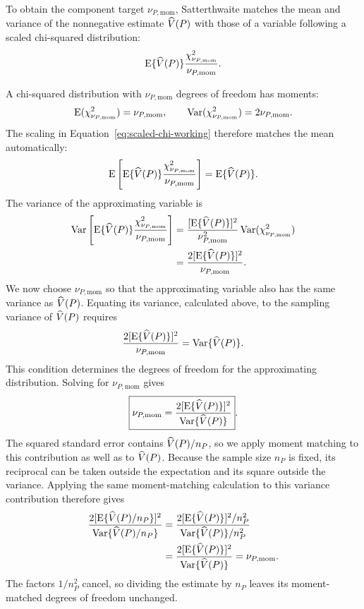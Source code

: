 \medskip
{}

To obtain the component target \(\nu_{P,\mathrm{mom}}\), Satterthwaite
matches the mean and variance of the nonnegative estimate \(\widehat V(P)\)
with those of a variable following a scaled chi-squared distribution:
\begin{equation}
  \operatorname{E}\{\widehat V(P)\}
  \frac{\chi^2_{\nu_{P,\mathrm{mom}}}}{\nu_{P,\mathrm{mom}}}.
  \label{eq:scaled-chi-working}
\end{equation}

A chi-squared distribution with \(\nu_{P,\mathrm{mom}}\) degrees of freedom
has moments:
\begin{equation}
  \operatorname{E}(\chi^2_{\nu_{P,\mathrm{mom}}})=\nu_{P,\mathrm{mom}},
  \qquad
  \operatorname{Var}(\chi^2_{\nu_{P,\mathrm{mom}}})=2\nu_{P,\mathrm{mom}}.
\end{equation}
The scaling in Equation~\eqref{eq:scaled-chi-working} therefore matches the
mean automatically:
\begin{equation}
  \operatorname{E}\left[
  \operatorname{E}\{\widehat V(P)\}\frac{\chi^2_{\nu_{P,\mathrm{mom}}}}{\nu_{P,\mathrm{mom}}}
  \right]
  =\operatorname{E}\{\widehat V(P)\}.
\end{equation}
The variance of the approximating variable is
\begin{align}
  \operatorname{Var}\left[
  \operatorname{E}\{\widehat V(P)\}\frac{\chi^2_{\nu_{P,\mathrm{mom}}}}{\nu_{P,\mathrm{mom}}}
  \right]
  &=
  \frac{[\operatorname{E}\{\widehat V(P)\}]^2}{\nu_{P,\mathrm{mom}}^2}
  \operatorname{Var}(\chi^2_{\nu_{P,\mathrm{mom}}})\\
  &=
  \frac{2[\operatorname{E}\{\widehat V(P)\}]^2}{\nu_{P,\mathrm{mom}}}.
\end{align}
We now choose \(\nu_{P,\mathrm{mom}}\) so that the approximating variable
also has the same variance as \(\widehat V(P)\). Equating its variance,
calculated above, to the sampling variance of \(\widehat V(P)\) requires
\begin{equation*}
  \frac{2[\operatorname{E}\{\widehat V(P)\}]^2}{\nu_{P,\mathrm{mom}}}
  =\operatorname{Var}\{\widehat V(P)\}.
\end{equation*}
This condition determines the degrees of freedom for the approximating
distribution. Solving for \(\nu_{P,\mathrm{mom}}\) gives
\begin{equation}
  \boxed{
  \nu_{P,\mathrm{mom}}
  =
  \frac{2[\operatorname{E}\{\widehat V(P)\}]^2}
       {\operatorname{Var}\{\widehat V(P)\}}
  }.
  \label{eq:component-df-moments}
\end{equation}
The squared standard error contains \(\widehat V(P)/n_P\), so we apply
moment matching to this contribution as well as to \(\widehat V(P)\).
Because the sample size \(n_P\) is fixed, its reciprocal can be taken
outside the expectation and its square outside the variance.
Applying the same moment-matching calculation to this variance contribution
therefore gives
\begin{align*}
  \frac{2[\operatorname{E}\{\widehat V(P)/n_P\}]^2}
       {\operatorname{Var}\{\widehat V(P)/n_P\}}
  &=\frac{2[\operatorname{E}\{\widehat V(P)\}]^2/n_P^2}
          {\operatorname{Var}\{\widehat V(P)\}/n_P^2}\\
  &=\frac{2[\operatorname{E}\{\widehat V(P)\}]^2}
          {\operatorname{Var}\{\widehat V(P)\}}
   =\nu_{P,\mathrm{mom}}.
\end{align*}
The factors \(1/n_P^2\) cancel, so dividing the estimate by \(n_P\)
leaves its moment-matched degrees of freedom unchanged.

